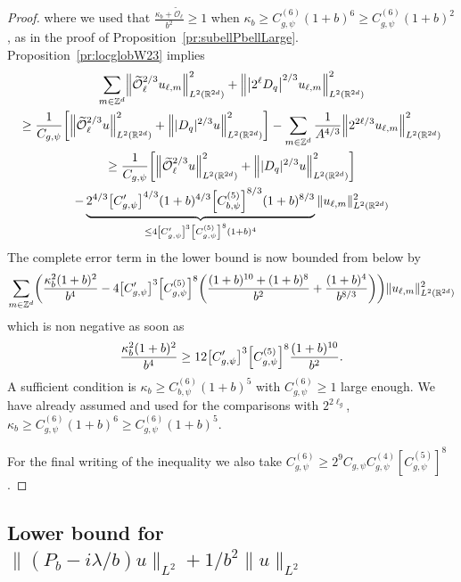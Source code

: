 \documentclass[AHL,Unicode,longabstracts]{cedram}
\newcommand{\Z}{\mathbb{Z}}
\newcommand{\R}{\mathbb{R}}
\newcommand{\clO}{\mathcal{O}}
\let\oldtilde\tilde
\renewcommand*{\tilde}[1]{\mathchoice{\widetilde{#1}}{\widetilde{#1}}{\oldtilde{#1}}{\oldtilde{#1}}}
\let\originalleft\left
\let\originalright\right
\renewcommand{\left}{\mathopen{}\mathclose\bgroup\originalleft}
\renewcommand{\right}{\aftergroup\egroup\originalright}
\begin{document}
\begin{proof}
\endgroup
where we used that $\frac{\kappa_{b}+\widetilde{\clO}_{\ell}}{b^{2}}\geq 1$ when $\kappa_{b}\geq C_{g,\psi}^{(6)}(1+b)^{6}\geq C_{g,\psi}^{(6)}(1+b)^{2}$, as in the proof of Proposition~\ref{pr:subellPbellLarge}. Proposition~\ref{pr:locglobW23} implies
\begin{multline*}
\sum_{m\in\Z^{d}}\left\|\tilde{\clO}_{\ell}^{2/3}u_{\ell,m}\right\|_{L^{2}(\R^{2d})}^{2}+
\left\|\left|2^{\ell}D_{q}\right|^{2/3}u_{\ell,m}\right\|_{L^{2}(\R^{2d})}^{2}
\\
\geq
\frac{1}{C_{g,\psi}}\left[
\left\|\tilde{\clO}_{\ell}^{2/3}u\right\|_{L^{2}(\R^{2d})}^{2}+
\left\||D_{q}|^{2/3}u\right\|_{L^{2}(\R^{2d})}^{2}
\right]-\sum_{m\in\Z^{d}}\frac{1}{A^{4/3}}
\left\|2^{2\ell/3}u_{\ell,m}\right\|_{L^{2}(\R^{2d})}^{2}
\\
\geq \frac{1}{C_{g,\psi}}\left[
\left\|\tilde{\clO}_{\ell}^{2/3}u\right\|_{L^{2}(\R^{2d})}^{2}+
\left\||D_{q}|^{2/3}u\right\|_{L^{2}(\R^{2d})}^{2}
\right]\\
-\underbrace{2^{4/3}\left[C_{g,\psi}'\right]^{4/3}(1+b)^{4/3}\left[C_{{b,\psi}}^{(5)}\right]^{8/3}(1+b)^{8/3}}_{\leq 4\left[C_{g,\psi}'\right]^{3}\left[C_{g,\psi}^{(5)}\right]^{8}(1+b)^{4}}\|u_{\ell,m}\|_{L^{2}(\R^{2d})}^{2}
\end{multline*}
The complete error term in the lower bound is now bounded from below by
\[
\sum_{m\in\Z^{d}}\left(\frac{\kappa_{b}^{2}(1+b)^{2}}{b^{4}}-4\left[C_{g,\psi}'\right]^{3}\left[C_{g,\psi}^{(5)}\right]^{8}\left(\frac{(1+b)^{10}+(1+b)^{8}}{b^{2}}+\frac{(1+b)^{4}}{b^{8/3}}\right)\right)
\|u_{\ell,m}\|_{L^{2}(\R^{2d})}^{2}
\]
which is non negative as soon as
\[
\frac{\kappa_{b}^2(1+b)^{2}}{b^{4}}\geq 12\left[C_{g,\psi}'\right]^{3}\left[C_{g,\psi}^{(5)}\right]^{8}\frac{(1+b)^{10}}{b^{2}}.
\]
A sufficient condition is $\kappa_{b}\geq C_{b,\psi}^{(6)}(1+b)^{5}$ with $C_{g,\psi}^{(6)}\geq 1$ large enough. We have already assumed and used for the comparisons with $2^{2\ell_{g}}$, $\kappa_{b}\geq C_{g,\psi}^{(6)}(1+b)^{6}\geq C_{g,\psi}^{(6)}(1+b)^{5}$.

For the final writing of the inequality we also take $C_{g,\psi}^{(6)}\geq 2^{9}C_{g,\psi}C_{g,\psi}^{(4)}[C_{g,\psi}^{(5)}]^{8}$.
\end{proof}

\subsection{Lower bound for \texorpdfstring{$\|(P_b-i\lambda/b)u\|_{L^2}+1/b^2\|u\|_{L^2}$}{|(P\_b-i lambda/b)u |\_L\^2+1/b\^2 |u |\_L\^2}}\label{sec:totallower}
\end{document}
